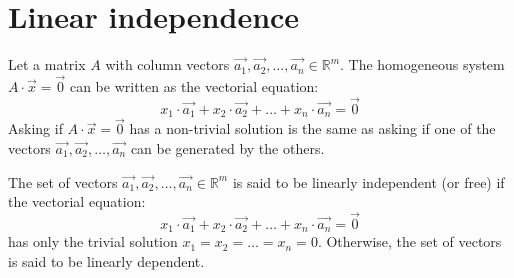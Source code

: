 \section{Linear independence}
Let a matrix $A$ with column vectors $\vec{a_1}, \vec{a_2}, \ldots, \vec{a_n} \in \mathbb{R}^m$. The homogeneous system $A \cdot \vec{x} = \vec{0}$ can be written as the vectorial equation:
\[
    x_1 \cdot \vec{a_1} + x_2 \cdot \vec{a_2} + \ldots + x_n \cdot \vec{a_n} = \vec{0}
\]
Asking if $A \cdot \vec{x} = \vec{0}$ has a non-trivial solution is the same as asking if one of the vectors $\vec{a_1}, \vec{a_2}, \ldots, \vec{a_n}$ can be generated by the others.
\begin{definition}
    The set of vectors $\vec{a_1}, \vec{a_2}, \ldots, \vec{a_n} \in \mathbb{R}^m$ is said to be linearly independent (or free) if the vectorial equation:
    \[
        x_1 \cdot \vec{a_1} + x_2 \cdot \vec{a_2} + \ldots + x_n \cdot \vec{a_n} = \vec{0}
    \]
    has only the trivial solution $x_1 = x_2 = \ldots = x_n = 0$. Otherwise, the set of vectors is said to be linearly dependent.
\end{definition}

